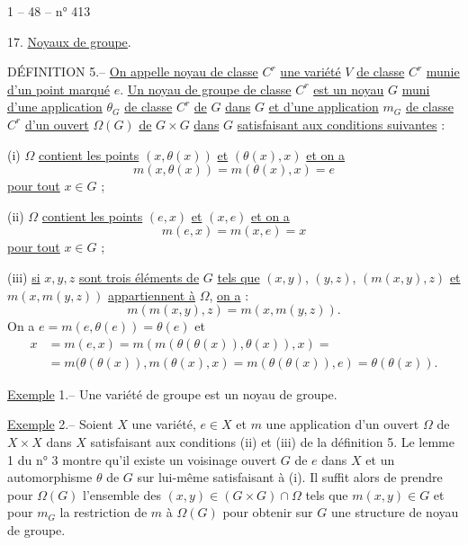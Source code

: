 1 -- 48 -- \hfill n° 413

17. \uline{Noyaux de groupe}.

DÉFINITION 5.-- \uline{On appelle noyau de classe} $C^r$ \uline{une variété} $V$ \uline{de classe} $C^r$ \uline{munie
d'un point marqué} $e$. \uline{Un noyau de groupe de classe} $C^r$ \uline{est un noyau} $G$ \uline{muni d'une
application} $\theta_G$ \uline{de classe} $C^r$ \uline{de} $G$ \uline{dans} $G$ \uline{et d'une application} $m_G$ \uline{de classe} $C^r$
\uline{d'un ouvert} $\Omega(G)$ \uline{de} $G\times G$ \uline{dans} $G$ \uline{satisfaisant aux conditions suivantes} :

(i) $\Omega$ \uline{contient les points} $(x,\theta(x))$ \uline{et} $(\theta(x),x)$ \uline{et on a}
\[
\tag{36} m(x,\theta(x))=m(\theta(x),x)=e
\]
\uline{pour tout} $x\in G$ ;

(ii) $\Omega$ \uline{contient les points} $(e,x)$ \uline{et} $(x,e)$ \uline{et on a}
\[
\tag{37} m(e,x)=m(x,e)=x
\]
\uline{pour tout} $x\in G$ ;

(iii) \uline{si} $x,y,z$ \uline{sont trois éléments de} $G$ \uline{tels que} $(x,y)$, $(y,z)$, $(m(x,y),z)$
\uline{et} $m(x,m(y,z))$ \uline{appartiennent à} $\Omega$, \uline{on a} :
\[
\tag{38} m(m(x,y),z)=m(x,m(y,z)).
\]
On a $e=m(e,\theta(e))=\theta(e)$ et
\[
\begin{aligned}
x&=m(e,x)=m(m(\theta(\theta(x)),\theta(x)),x)=\\
&=m(\theta(\theta(x)),m(\theta(x),x)=m(\theta(\theta(x)),e)=\theta(\theta(x)).
\end{aligned}
\]

\uline{Exemple} 1.-- Une variété de groupe est un noyau de groupe.

\uline{Exemple} 2.-- Soient $X$ une variété, $e\in X$ et $m$ une application d'un ouvert $\Omega$ de $X\times X$
dans $X$ satisfaisant aux conditions (ii) et (iii) de la définition 5. Le lemme 1
du n° 3 montre qu'il existe un voisinage ouvert $G$ de $e$ dans $X$ et un automorphisme $\theta$
de $G$ sur lui-même satisfaisant à (i). Il suffit alors de prendre pour $\Omega(G)$
l'ensemble des $(x,y)\in(G\times G)\cap\Omega$ tels que $m(x,y)\in G$ et pour $m_G$ la restriction de $m$
à $\Omega(G)$ pour obtenir sur $G$ une structure de noyau de groupe.
